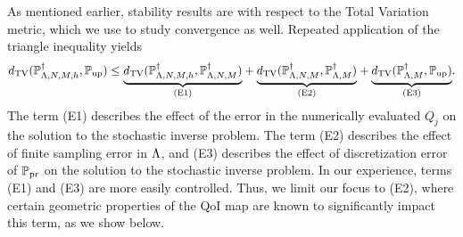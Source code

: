 As mentioned earlier, stability results are with respect to the Total Variation metric, which we use to study convergence as well.
Repeated application of the triangle inequality yields
\begin{equation}
\label{eq:triangleineq}
d_{\text{TV}}(\mathbb{P}_{{\Lambda},N,M,h}^\dagger, \operatorname*{\mathbb{P}_{up}}) \leq 
\underset{ \text{(E1)} }{\underbrace{ d_{\text{TV}}(\mathbb{P}_{{\Lambda},N,M,h}^\dagger, \mathbb{P}_{{\Lambda},N,M}^\dagger)}} + 
\underset{ \text{(E2)} }{\underbrace{ d_{\text{TV}}(\mathbb{P}_{{\Lambda},N,M}^\dagger, \mathbb{P}_{{\Lambda},M}^\dagger) }}+ 
\underset{ \text{(E3)} }{\underbrace{ d_{\text{TV}}(\mathbb{P}_{{\Lambda},M}^\dagger, \operatorname*{\mathbb{P}_{up}}) }}.
\end{equation}
The term (E1) describes the effect of the error in the numerically evaluated $Q_j$ on the solution to the stochastic inverse problem. 
The term (E2) describes the effect of finite sampling error in ${\Lambda}$, and (E3) describes the effect of discretization error of $\operatorname*{\mathbb{P}_{pr}}$ on the solution to the stochastic inverse problem. 
In our experience, terms (E1) and (E3) are more easily controlled.
Thus, we limit our focus to (E2), where certain geometric properties of the QoI map are known to significantly impact this term, as we show below. 

